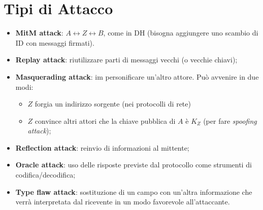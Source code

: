 \documentclass[11pt, a4paper, twoside, italian]{report}
\theoremstyle{plain}
\begin{document}
\section*{Tipi di Attacco}
\begin{itemize}
	\item \textbf{MitM attack}: $A \leftrightarrow Z \leftrightarrow B $, come in DH (bisogna aggiungere uno scambio di ID con messaggi firmati).
	\item \textbf{Replay attack}: riutilizzare parti di messaggi vecchi (o vecchie chiavi);
	\item \textbf{Masquerading attack}: im personificare un'altro attore. Può avvenire in due modi:
		\begin{itemize}
			\item $Z$ forgia un indirizzo sorgente (nei protocolli di rete)
			\item $Z$ convince altri attori che la chiave pubblica di $A$ è $K_{Z}$ (per fare \textit{spoofing attack});
		\end{itemize}
	\item \textbf{Reflection attack}: reinvio di informazioni al mittente;
	\item \textbf{Oracle attack}: uso delle risposte previste dal protocollo come strumenti di codifica/decodifica;
	\item \textbf{Type flaw attack}: sostituzione di un campo con un'altra informazione che verrà interpretata dal ricevente in un modo favorevole all'attaccante.
\end{itemize}
\end{document}
